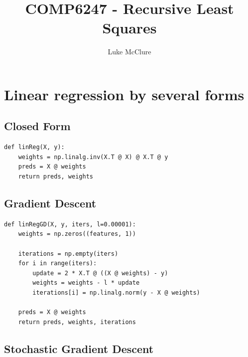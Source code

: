 \documentclass[sigconf]{acmart}
\begin{document}
\title{COMP6247 - Recursive Least Squares}
\author{Luke McClure}

\maketitle
\pagestyle{myheadings} 

\section{Linear regression by several forms}
\subsection{Closed Form}

\begin{listing}[H]
    \begin{verbatim}
def linReg(X, y):
    weights = np.linalg.inv(X.T @ X) @ X.T @ y
    preds = X @ weights
    return preds, weights
    \end{verbatim}
\end{listing}

\subsection{Gradient Descent}

\begin{listing}[H]
    \begin{verbatim}
def linRegGD(X, y, iters, l=0.00001):
    weights = np.zeros((features, 1))
    
    iterations = np.empty(iters)
    for i in range(iters):
        update = 2 * X.T @ ((X @ weights) - y)
        weights = weights - l * update
        iterations[i] = np.linalg.norm(y - X @ weights)
    
    preds = X @ weights
    return preds, weights, iterations
    \end{verbatim}
\end{listing}

\subsection{Stochastic Gradient Descent}
\end{document}
